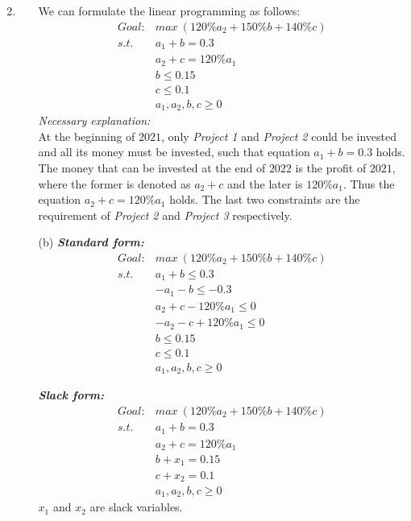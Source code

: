 \documentclass[12pt,a4paper]{article}
\makeatletter
\newtheorem*{solution}{Solution}
\theoremstyle{definition}
\renewenvironment{solution}[1][Solution] {\par\pushQED{\qed}\normalfont\topsep6\p@\@plus6\p@\relax\trivlist\item[\hskip\labelsep\bfseries#1\@addpunct{.}]\ignorespaces}{\popQED\endtrivlist\@endpefalse} \makeatother
\makeatother
\begin{document}
\begin{enumerate}
\begin{solution}
\begin{enumerate}
        We can formulate the linear programming as follows:
        \begin{equation}\nonumber
            \begin{split}
             Goal: & max\ (120\% a_2+150\% b+140\% c) \\ 
             s.t.\  & a_1+b=0.3 \\
                    & a_2+c=120\% a_1\\ 
                    & b\leq 0.15\\
                    & c\leq 0.1 \\
                    & a_1,a_2,b,c\geq 0
            \end{split}
        \end{equation}
        \textit{Necessary explanation:} 
        \\
        At the beginning of $2021$, only \emph{Project 1} and \emph{Project 2} could be invested and all its money must be invested, such that equation $a_1+b=0.3$ holds. The money that can be invested at the end of $2022$ is the profit of $2021$, where the former is denoted as $a_2+c$ and the later is $120\% a_1$. Thus the equation $a_2+c=120\% a_1$ holds. The last two constraints are the requirement of \emph{Project 2} and \emph{Project 3} respectively.
        
        \item [(b)]
        \textbf{\textit{Standard form:}}
        \begin{equation}\nonumber
            \begin{split}
            Goal: & max\ (120\% a_2+150\% b+140\% c) \\ 
            s.t.\  & a_1+b\leq 0.3 \\
                    & -a_1-b\leq -0.3 \\
                    & a_2+c-120\% a_1\leq 0\\
                    & -a_2-c+120\% a_1\leq 0\\
                    & b\leq 0.15\\
                    & c\leq 0.1 \\
                    & a_1,a_2,b,c\geq 0
            \end{split}
        \end{equation}
        
        \textbf{\textit{Slack form:}}
        \begin{equation}\nonumber
            \begin{split}
             Goal: & max\ (120\% a_2+150\% b+140\% c) \\ 
             s.t.\  & a_1+b=0.3 \\
                    & a_2+c=120\% a_1\\ 
                    & b+x_1= 0.15\\
                    & c+x_2= 0.1 \\
                    & a_1,a_2,b,c\geq 0
            \end{split}
        \end{equation}
        $x_1$ and $x_2$ are slack variables.
        

\end{enumerate}
\end{solution}
\end{enumerate}
\end{document}
